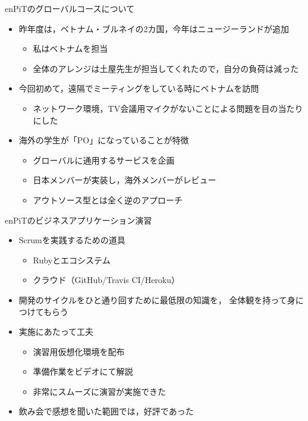 \documentclass[t]{beamer}
\begin{document}
\begin{frame}[label=sec-9]{enPiTのグローバルコースについて}
\begin{itemize}
\item 昨年度は，ベトナム・ブルネイの2カ国，今年はニュージーランドが追加
\begin{itemize}
\item 私はベトナムを担当
\item 全体のアレンジは土屋先生が担当してくれたので，自分の負荷は減った
\end{itemize}
\item 今回初めて，遠隔でミーティングをしている時にベトナムを訪問
\begin{itemize}
\item ネットワーク環境，TV会議用マイクがないことによる問題を目の当たりにした
\end{itemize}
\item 海外の学生が「PO」になっていることが特徴
\begin{itemize}
\item グローバルに通用するサービスを企画
\item 日本メンバーが実装し，海外メンバーがレビュー
\item アウトソース型とは全く逆のアプローチ
\end{itemize}
\end{itemize}
\end{frame}
\begin{frame}[label=sec-10]{enPiTのビジネスアプリケーション演習}
\begin{itemize}
\item Scrumを実践するための道具
\begin{itemize}
\item Rubyとエコシステム
\item クラウド（GitHub/Travis CI/Heroku）
\end{itemize}
\item 開発のサイクルをひと通り回すために最低限の知識を，
全体観を持って身につけてもらう
\item 実施にあたって工夫
\begin{itemize}
\item 演習用仮想化環境を配布
\item 準備作業をビデオにて解説
\item 非常にスムーズに演習が実施できた
\end{itemize}
\item 飲み会で感想を聞いた範囲では，好評であった
\end{itemize}
\end{frame}
\end{document}
